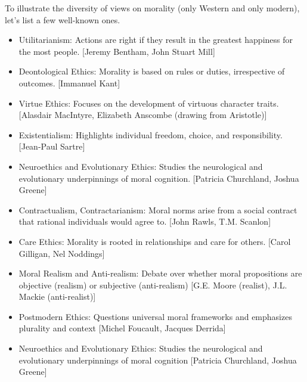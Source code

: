 \documentclass[11pt,a4]{article}
\begin{document}
        To illustrate the diversity of views on morality (only Western and only modern), let's list a few well-known ones.

        \begin{itemize}
            \item Utilitarianism: Actions are right if they result in the
            greatest happiness for the most people. [Jeremy Bentham, John Stuart Mill]

            \item Deontological Ethics: Morality is based on rules or duties, irrespective of outcomes. [Immanuel Kant]
            \item Virtue Ethics: Focuses on the development of virtuous character traits. [Alasdair MacIntyre, Elizabeth Anscombe (drawing from Aristotle)]
            \item Existentialism: Highlights individual freedom, choice, and responsibility. [Jean-Paul Sartre]
            \item Neuroethics and Evolutionary Ethics:  Studies the neurological and evolutionary underpinnings of moral cognition. [Patricia Churchland, Joshua Greene]
            \item Contractualism, Contractarianism: Moral norms arise from a social contract that rational individuals
                  would agree to. [John Rawls, T.M. Scanlon]


            \item Care Ethics: Morality is rooted in relationships and care for others.
                [Carol Gilligan, Nel Noddings]

            \item Moral Realism and Anti-realism:
                 Debate over whether moral propositions are objective (realism)
                or subjective (anti-realism)
                [G.E. Moore (realist), J.L. Mackie (anti-realist)]

            \item Postmodern Ethics:
                 Questions universal moral frameworks and emphasizes plurality and context
                [Michel Foucault, Jacques Derrida]

            \item Neuroethics and Evolutionary Ethics:
                Studies the neurological and evolutionary underpinnings of moral cognition
                [Patricia Churchland, Joshua Greene]


        \end{itemize}
\end{document}
